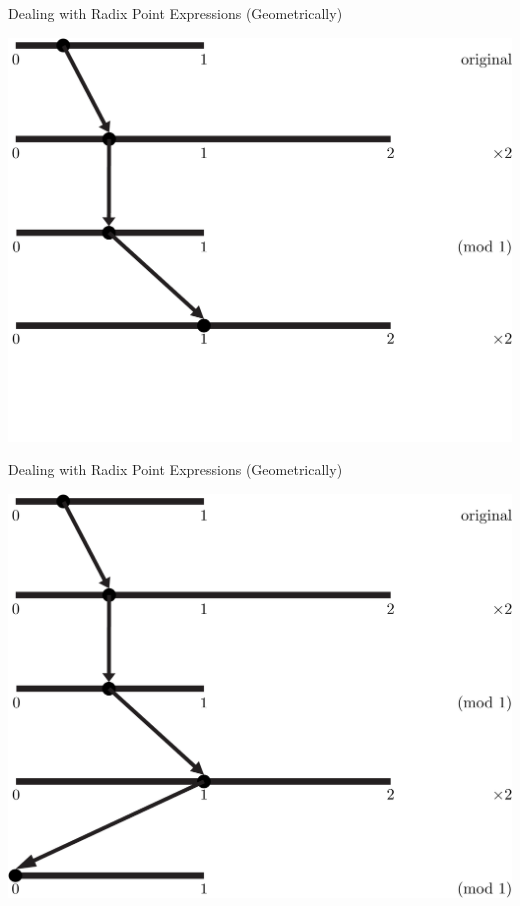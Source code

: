 \documentclass{beamer}
\begin{document}
\begin{frame}{Dealing with Radix Point Expressions (Geometrically)}
  \begin{example}
    \includegraphics[width=\textwidth,height=0.75\textheight]{images/Binary/4}
  \end{example}
\end{frame}

\begin{frame}{Dealing with Radix Point Expressions (Geometrically)}
  \begin{example}
    \includegraphics[width=\textwidth,height=0.75\textheight]{images/Binary/5}
  \end{example}
\end{frame}
\end{document}
